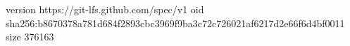 version https://git-lfs.github.com/spec/v1
oid sha256:b8670378a781d684f2893cbc3969f9ba3c72c726021af6217d2e66f6d4bf0011
size 376163
